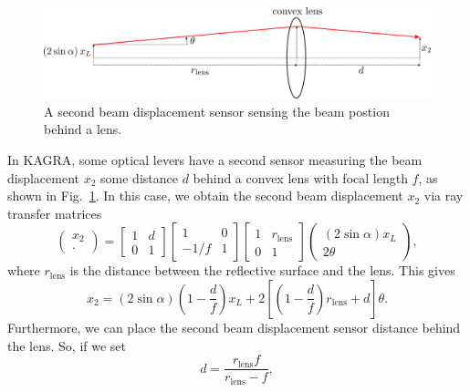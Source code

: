 \begin{figure}[!h]
	\centering
	\includegraphics[width=134mm]{figures/optical_lever_lens}
	\caption{A second beam displacement sensor sensing the beam postion behind a lens.}
	\label{fig:opticalleverlens}
\end{figure}
In KAGRA, some optical levers have a second sensor measuring the beam displacement $x_2$ some distance $d$ behind a convex lens with focal length $f$, as shown in Fig.~\ref{fig:opticalleverlens}.
In this case, we obtain the second beam displacement $x_2$ via ray transfer matrices \cite{enwiki:1018856234}
\begin{equation}
	\begin{pmatrix}
		x_2\\
		\cdot
	\end{pmatrix}
	=
	\begin{bmatrix}
		1 & d\\
		0 & 1
	\end{bmatrix}
	\begin{bmatrix}
		1 & 0\\
		-1/f & 1
	\end{bmatrix}
	\begin{bmatrix}
		1 & r_\mathrm{lens} \\
		0 & 1
	\end{bmatrix}
	\begin{pmatrix}
		\left(2\sin{\alpha} \right)x_L\\
		2\theta
	\end{pmatrix},
\end{equation}
where $r_\mathrm{lens}$ is the distance between the reflective surface and the lens.
This gives
\begin{equation}
	x_2 = \left(2\sin\alpha\right)\left(1-\frac{d}{f}\right)x_L + 2\left[\left(1-\frac{d}{f}\right)r_\mathrm{lens}+d\right]\theta. 
	\label{eqn:beam_displacement_lens_1}
\end{equation}
Furthermore, we can place the second beam displacement sensor distance behind the lens.
So, if we set
\begin{equation}
	d=\frac{r_\mathrm{lens}f}{r_\mathrm{lens}-f},
	\label{eqn:d}
\end{equation}
